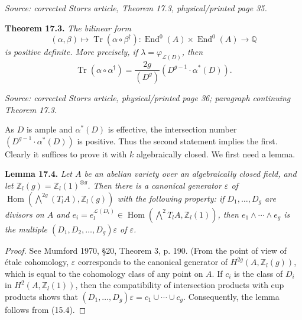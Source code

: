 \documentclass[11pt]{article}
\DeclareMathOperator{\AVEnd}{End}
\DeclareMathOperator{\AVHom}{Hom}
\DeclareMathOperator{\AVTr}{Tr}
\newcommand{\AVQ}{\mathbb{Q}}
\newcommand{\AVZ}{\mathbb{Z}}
\newcommand{\AVsrc}[1]{\par\smallskip\noindent\textit{Source: #1.}\par\smallskip}
\begin{document}
\AVsrc{corrected Storrs article, Theorem 17.3, physical/printed page 35}
\noindent\textbf{Theorem 17.3.}
\emph{The bilinear form}
\[
(\alpha,\beta)\longmapsto\AVTr(\alpha\circ\beta^{\dagger}):
\AVEnd^0(A)\times\AVEnd^0(A)\longrightarrow\AVQ
\]
\emph{is positive definite. More precisely, if
$\lambda=\varphi_{\mathcal L(D)}$, then}
\[
\AVTr(\alpha\circ\alpha^{\dagger})
=\frac{2g}{(D^g)}(D^{g-1}\cdot\alpha^*(D)).
\]

\AVsrc{corrected Storrs article, physical/printed page 36; paragraph continuing Theorem 17.3}
As $D$ is ample and $\alpha^*(D)$ is effective, the intersection number
$(D^{g-1}\cdot\alpha^*(D))$ is positive. Thus the second statement implies
the first. Clearly it suffices to prove it with $k$ algebraically closed.
We first need a lemma.

\noindent\textbf{Lemma 17.4.}
\emph{Let $A$ be an abelian variety over an algebraically closed field,
and let $\AVZ_l(g)=\AVZ_l(1)^{\otimes g}$. Then there is a canonical
generator $\varepsilon$ of
$\AVHom(\bigwedge^{2g}(T_l A),\AVZ_l(g))$ with the following property:
if $D_1,\ldots,D_g$ are divisors on $A$ and
$e_i=e_l^{\mathcal L(D_i)}\in
\AVHom(\bigwedge^2T_l A,\AVZ_l(1))$, then
$e_1\wedge\cdots\wedge e_g$ is the multiple
$(D_1,D_2,\ldots,D_g)\varepsilon$ of $\varepsilon$.}

\begin{proof}
See Mumford 1970, \S20, Theorem 3, p. 190. (From the point of view of
\'etale cohomology, $\varepsilon$ corresponds to the canonical generator
of $H^{2g}(A,\AVZ_l(g))$, which is equal to the cohomology class of any
point on $A$. If $c_i$ is the class of $D_i$ in $H^2(A,\AVZ_l(1))$,
then the compatibility of intersection products with cup products shows
that $(D_1,\ldots,D_g)\varepsilon=c_1\cup\cdots\cup c_g$.
Consequently, the lemma follows from (15.4).
\end{proof}
\end{document}
